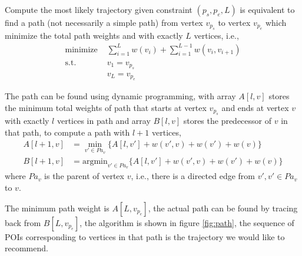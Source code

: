 \documentclass{sig-alternate-05-2015}
\begin{document}
Compute the most likely trajectory given constraint $(p_s, p_e, L)$ is
equivalent to find a path (not necessarily a simple path) from vertex $v_{p_s}$ to
vertex $v_{p_e}$ which minimize the total path weights and with exactly $L$ vertices,
i.e.,
\begin{align*}
    \text{minimize~} & \sum_{i=1}^{L} w(v_i) + \sum_{i=1}^{L-1} w(v_i, v_{i+1}) \\
    \text{s.t.~~~~~} & v_1 = v_{p_s} \\
                     & v_L = v_{p_e} 
\end{align*}
    
The path can be found using dynamic programming, 
with array $A[l, v]$ stores the minimum total weights of path 
that starts at vertex $v_{p_s}$ and ends at vertex $v$ with 
exactly $l$ vertices in path and 
array $B[l, v]$ stores the predecessor of $v$ in that path,
to compute a path with $l+1$ vertices,
\begin{align*}
    A[l+1, v] &= \min_{v' \in Pa_v} \{ A[l, v'] + w(v', v) + w(v') + w(v) \} \\
    B[l+1, v] &= \text{argmin}_{v' \in Pa_v} \{ A[l, v'] + w(v', v) + w(v') + w(v) \} 
\end{align*}
where $Pa_v$ is the parent of vertex $v$, 
i.e., 
there is a directed edge from $v', v' \in Pa_v$ to $v$.

The minimum path weight is $A[L, v_{p_e}]$,
the actual path can be found by tracing back from $B[L, v_{p_e}]$,
the algorithm is shown in figure \ref{fig:path},
the sequence of POIs corresponding to vertices in that path is the 
trajectory we would like to recommend.
\end{document}
